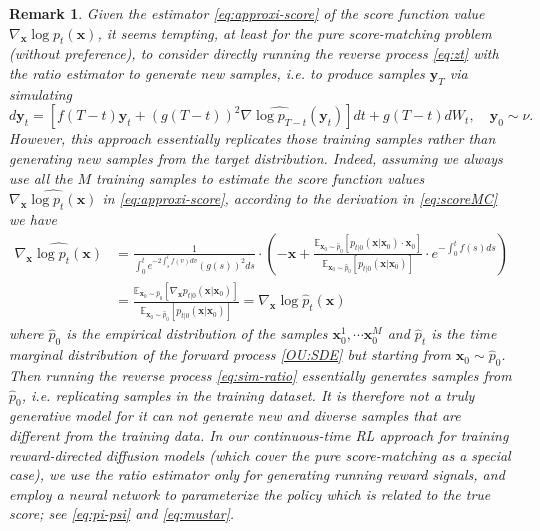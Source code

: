 \documentclass[11pt]{article}
\newtheorem{remark}{Remark}
\begin{document}
\begin{remark}
Given the estimator  \eqref{eq:approxi-score} of the score function value $\nabla_{\mathbf{x}}\log p_{t}(\mathbf{x})$, it seems tempting, at least for the pure score-matching problem (without preference), to consider directly running the reverse process \eqref{eq:zt} with the ratio estimator to generate new samples, i.e. to produce samples $\mathbf{y}_T$ via simulating
\begin{equation}\label{eq:sim-ratio}
    d\mathbf{y}_{t}=\left[f(T-t)\mathbf{y}_{t}+(g(T-t))^{2}\nabla\widehat{\log p_{T-t}}(\mathbf{y}_{t})\right]dt
+g(T-t)dW_t, \quad \mathbf{y}_{0}\sim\nu.
\end{equation}
However, this approach essentially replicates those training samples rather than generating {\em new} samples from the target distribution. Indeed, assuming we always use all the $M$ training samples to estimate the score function values $\widehat{ \nabla_{\mathbf{x}}\log p_{t}(\mathbf{x}) }$ in \eqref{eq:approxi-score}, according to the derivation in \eqref{eq:scoreMC} we have
\begin{align*}
    \widehat{ \nabla_{\mathbf{x}}\log p_{t}(\mathbf{x}) }
    &= \frac{1} { \int_{0}^{t}e^{-2\int_{s}^{t}f(v)dv}(g(s))^{2}ds} \cdot \left( -  \mathbf{x} +  \frac{\mathbb{E}_{\mathbf{x}_{0} \sim \hat p_0 } \left[  p_{t|0}(\mathbf{x} | \mathbf{x}_{0})  \cdot  {\mathbf{x}_{0}  } \right] }{ \mathbb{E}_{\mathbf{x}_{0} \sim \hat p_0 } [ p_{t|0}(\mathbf{x} | \mathbf{x}_{0})] } \cdot e^{-\int_{0}^{t}f(s)ds}  \right) \\
    &= \frac{\mathbb{E}_{\mathbf{x}_{0} \sim \hat p_0 } [  \nabla_{\mathbf{x}}  p_{t|0}(\mathbf{x} | \mathbf{x}_{0})]}{ \mathbb{E}_{\mathbf{x}_{0} \sim \hat p_0 } [ p_{t|0}(\mathbf{x} | \mathbf{x}_{0})] }= \nabla_{\mathbf{x}}\log \hat p_{t}(\mathbf{x})
\end{align*}
where $\hat p_0$ is the empirical distribution of the samples $\mathbf{x}_0^1, \cdots \mathbf{x}_0^M$ and $\hat p_t$ is the time marginal distribution of the forward process \eqref{OU:SDE} but starting from $\mathbf{x}_0\sim \hat p_0$. Then running the reverse process \eqref{eq:sim-ratio} essentially generates samples from $\hat p_0$, i.e. replicating samples in the training dataset. It is therefore not a truly generative model for it can not generate new and diverse samples that are different from the training data. In our continuous-time RL approach for training reward-directed diffusion models (which cover the pure score-matching as a special case), we use the ratio estimator only for generating running reward signals, and employ  a neural network to parameterize the policy which is related to the true score; see \eqref{eq:pi-psi} and \eqref{eq:mustar}.
\end{remark}
\end{document}
